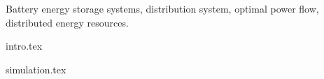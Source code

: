 \documentclass[conference]{IEEEtran} %
\begin{document}
\begin{IEEEkeywords}
Battery energy storage systems, distribution system, optimal power flow, distributed energy resources.
\end{IEEEkeywords}

{intro.tex}



{simulation.tex}









\end{document}
